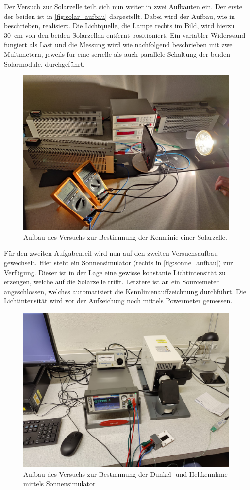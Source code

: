 \documentclass[english, ngerman]{scrartcl}
\begin{document}
Der Versuch zur Solarzelle teilt sich nun weiter in zwei Aufbauten ein. Der erste der beiden ist in \autoref{fig:solar_aufbau} dargestellt. Dabei wird der Aufbau, wie in \cite{ref:angabe_solar} beschrieben, realisiert. Die Lichtquelle, die Lampe rechts im Bild, wird hierzu \SI{30}{cm} von den beiden Solarzellen entfernt positioniert. Ein variabler Widerstand fungiert als Last und die Messung wird wie nachfolgend beschrieben mit zwei Multimetern, jeweils für eine serielle als auch parallele Schaltung der beiden Solarmodule, durchgeführt.
%
\begin{figure}[H]
    \centering
    \begin{samepage}
        \includegraphics[width=0.6\linewidth]{fig/Aufbau_solar.jpeg}
        \caption[Aufbau Kennlinie Solarzelle Lampe]{Aufbau des Versuchs zur Bestimmung der Kennlinie einer Solarzelle.}
        \label{fig:solar_aufbau}
    \end{samepage}
\end{figure}
%
Für den zweiten Aufgabenteil wird nun auf den zweiten Versuchsaufbau gewechselt. Hier steht ein Sonnensimulator (rechts in \autoref{fig:sonne_aufbau}) zur Verfügung. Dieser ist in der Lage eine gewisse konstante Lichtintensität zu erzeugen, welche auf die Solarzelle trifft. Letztere ist an ein Sourcemeter angeschlossen, welches automatisiert die Kennlinienauffzeichnung durchführt. Die Lichtintensität wird vor der Aufzeichung noch mittels Powermeter gemessen.
%
\begin{figure}[H]
    \centering
    \begin{samepage}
        \includegraphics[width=0.6\linewidth]{fig/Aufbau_Sonnensimulator.jpeg}
        \caption[Aufbau Hell- und Dunkelkennlinie Solarzelle Sonnensimulator]{Aufbau des Versuchs zur Bestimmung der Dunkel- und Hellkennlinie mittels Sonnensimulator}
        \label{fig:sonne_aufbau}
    \end{samepage}
\end{figure}
\end{document}
